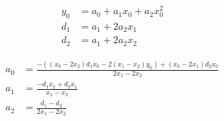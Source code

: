 \begin{align}
  y_0 & = a_0+a_1 x_0+a_2 x_0^{2}  \\
   d_1 & = a_1+2 a_2 x_1  \\
   d_2 & = a_1+2 a_2 x_2  
\end{align}

 
\begin{align}
  a_0 & = \frac
{ -  \left(  \left( x_0 - 2 x_2 \right)  d_1 x_0 - 2  \left( x_1 - x_2 \right)  y_0  \right) + \left( x_0 - 2 x_1 \right)  d_2 x_0}
{2 x_1 - 2 x_2} \\
   a_1 & = \frac
{ - d_1 x_2+d_2 x_1}
{x_1 - x_2} \\
   a_2 & = \frac
{d_1 - d_2}
{2 x_1 - 2 x_2} 
\end{align}
